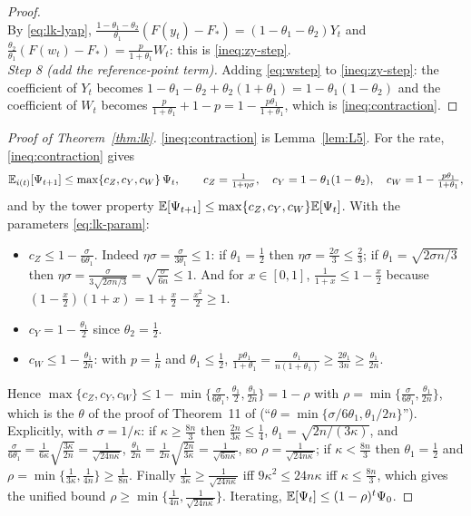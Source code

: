 \begin{proof}
\begin{equation*}
\end{equation*}
By \eqref{eq:lk-lyap}, $\frac{1-\theta_1-\theta_2}{\theta_1}(F(y_t)-F_\ast)=(1-\theta_1-\theta_2)Y_t$ and $\frac{\theta_2}{\theta_1}(F(w_t)-F_\ast)=\frac{p}{1+\theta_1}W_t$: this is \eqref{ineq:zy-step}.\\
\emph{Step 8 (add the reference-point term).} Adding \eqref{eq:wstep} to \eqref{ineq:zy-step}: the coefficient of $Y_t$ becomes $1-\theta_1-\theta_2+\theta_2(1+\theta_1)=1-\theta_1(1-\theta_2)$ and the coefficient of $W_t$ becomes $\frac p{1+\theta_1}+1-p=1-\frac{p\theta_1}{1+\theta_1}$, which is \eqref{ineq:contraction}.
\end{proof}

\begin{proof}[Proof of Theorem~\ref{thm:lk}]\label{prf:thm:lk}
\eqref{ineq:contraction} is Lemma~\ref{lem:L5}. For the rate, \eqref{ineq:contraction} gives
\begin{equation*}
\mathbb{E}_{i(t)}[\Psi_{t+1}]\le\max\{c_Z,c_Y,c_W\}\,\Psi_t,\qquad c_Z=\tfrac1{1+\eta\sigma},\quad c_Y=1-\theta_1(1-\theta_2),\quad c_W=1-\tfrac{p\theta_1}{1+\theta_1},
\end{equation*}
and by the tower property $\mathbb{E}[\Psi_{t+1}]\le\max\{c_Z,c_Y,c_W\}\mathbb{E}[\Psi_t]$. With the parameters \eqref{eq:lk-param}:
\begin{itemize}
\item $c_Z\le1-\frac{\sigma}{6\theta_1}$. Indeed $\eta\sigma=\frac{\sigma}{3\theta_1}\le1$: if $\theta_1=\frac12$ then $\eta\sigma=\frac{2\sigma}3\le\frac23$; if $\theta_1=\sqrt{2\sigma n/3}$ then $\eta\sigma=\frac{\sigma}{3\sqrt{2\sigma n/3}}=\sqrt{\frac{\sigma}{6n}}\le1$. And for $x\in[0,1]$, $\frac1{1+x}\le1-\frac x2$ because $(1-\frac x2)(1+x)=1+\frac x2-\frac{x^2}2\ge1$.
\item $c_Y=1-\frac{\theta_1}2$ since $\theta_2=\frac12$.
\item $c_W\le1-\frac{\theta_1}{2n}$: with $p=\frac1n$ and $\theta_1\le\frac12$, $\frac{p\theta_1}{1+\theta_1}=\frac{\theta_1}{n(1+\theta_1)}\ge\frac{2\theta_1}{3n}\ge\frac{\theta_1}{2n}$.
\end{itemize}
Hence $\max\{c_Z,c_Y,c_W\}\le1-\min\{\frac{\sigma}{6\theta_1},\frac{\theta_1}2,\frac{\theta_1}{2n}\}=1-\rho$ with $\rho=\min\{\frac\sigma{6\theta_1},\frac{\theta_1}{2n}\}$, which is the $\theta$ of the proof of Theorem~11 of \cite{kovalev2020dont} (``$\theta=\min\{\sigma/6\theta_1,\theta_1/2n\}$''). Explicitly, with $\sigma=1/\kappa$: if $\kappa\ge\frac{8n}3$ then $\frac{2n}{3\kappa}\le\frac14$, $\theta_1=\sqrt{2n/(3\kappa)}$, and $\frac\sigma{6\theta_1}=\frac1{6\kappa}\sqrt{\frac{3\kappa}{2n}}=\frac1{\sqrt{24n\kappa}}$, $\frac{\theta_1}{2n}=\frac1{2n}\sqrt{\frac{2n}{3\kappa}}=\frac1{\sqrt{6n\kappa}}$, so $\rho=\frac1{\sqrt{24n\kappa}}$; if $\kappa<\frac{8n}3$ then $\theta_1=\frac12$ and $\rho=\min\{\frac1{3\kappa},\frac1{4n}\}\ge\frac1{8n}$. Finally $\frac1{3\kappa}\ge\frac1{\sqrt{24n\kappa}}$ iff $9\kappa^2\le24n\kappa$ iff $\kappa\le\frac{8n}3$, which gives the unified bound $\rho\ge\min\{\frac1{4n},\frac1{\sqrt{24n\kappa}}\}$. Iterating, $\mathbb{E}[\Psi_t]\le(1-\rho)^t\Psi_0$.
\end{proof}

